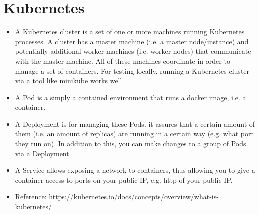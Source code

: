 \documentclass[fancy,11pt,titlestyle=display]{style/elegantbook}
\begin{document}
\chapter{Kubernetes}
\begin{itemize}
\item A Kubernetes cluster is a set of one or more machines running Kubernetes processes. A cluster has a master machine (i.e. a master node/instance) and potentially additional worker machines (i.e. worker nodes) that communicate with the master machine. All of these machines coordinate in order to manage a set of containers. For testing locally, running a Kubernetes cluster via a tool like minikube works well.
\item A Pod is a simply a contained environment that runs a docker image, i.e. a container.
\item A Deployment is for managing these Pods. it assures that a certain amount of them (i.e. an amount of replicas) are running in a certain way (e.g. what port they run on). In addition to this, you can make changes to a group of Pods via a Deployment.
\item A Service allows exposing a network to containers, thus allowing you to give a container access to ports on your public IP, e.g. http of your public IP.
\item Reference: \href{https://kubernetes.io/docs/concepts/overview/what-is-kubernetes/}{https://kubernetes.io/docs/concepts/overview/what-is-kubernetes/}
\end{itemize}










\end{document}
